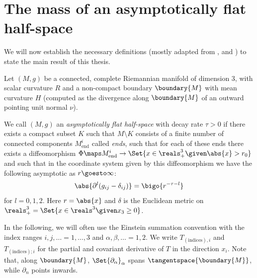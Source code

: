 \documentclass[titlepage,numbers=noenddot,headinclude,oneside,%
footinclude=true,cleardoublepage=empty,%
BCOR=5mm,paper=a4,fontsize=11pt,%
english,%
]{scrartcl}
\begin{document}
\section{The mass of an asymptotically flat half-space}
We will now establish the necessary definitions (mostly adapted from \cite{almarazPositiveMassTheorem2016}, \cite{eichmairDoublingAsymptoticallyFlat2023} and \cite{brayHarmonicFunctionsMass2019}) to state the main result of this thesis.
\begin{definition}\label{def:asymptotically_flat_half_space}
    Let \( (M,g) \) be a connected, complete Riemannian manifold of dimension 3, with scalar curvature \( R \) and a non-compact boundary \( \boundary{M} \) with mean curvature \( H \) (computed as the divergence along \( \boundary{M} \) of an outward pointing unit normal \( \nu \)).

    We call \((M,g) \) an \emph{asymptotically flat half-space} with decay rate \( \tau>0 \) if there exists a compact subset \( K \) such that \( M\setminus K \) consists of a finite number of connected components \(M_{\mathrm{end}}^i \) called \emph{ends}, such that for each of these ends there exists a diffeomorphism \( \Phi\maps M_{\mathrm{end}}^i \to \Set{x\in \reals^3_+\given \abs{x}>r_0} \) and such that in the coordinate system given by this diffeomorphism we have the following asymptotic as \( r\goesto \infty \):
    \begin{equation}
        \abs{\partial^l(g_{ij}-\delta_{ij})}=\bigo{r^{-\tau-l}}
    \end{equation}
    for \( l=0,1,2 \). Here \( r=\abs{x} \) and \( \delta \) is the Euclidean metric on \( \reals^3_+=\Set{x\in \reals^3\given x_3\geq 0} \). 
\end{definition}    
In the following, we will often use the Einstein summation convention with the index ranges \( i,j,\dotsc=1,\dotsc,3\) and \( \alpha,\beta,\dotsc=1,2 \). We write \( T_{(\text{indices}),i} \) and \( T_{(\text{indices});i} \) for the partial and covariant derivative of \( T \) in the direction \( x_i \). Note that, along \( \boundary{M} \), \( \Set{\partial_\alpha}_\alpha \) spans \( \tangentspace{\boundary{M}} \), while \( \partial_n \) points inwards.
\end{document}
